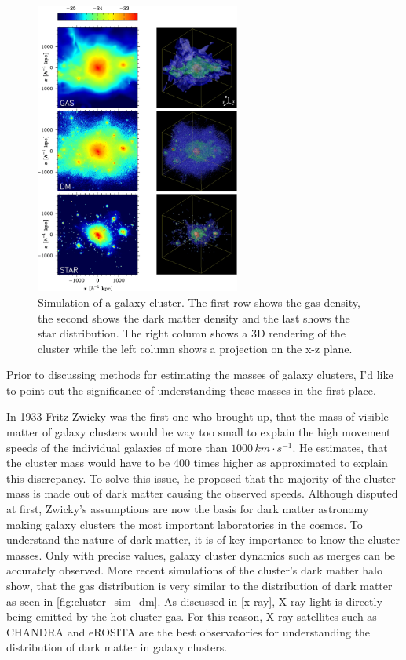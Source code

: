 \begin{figure}[h]
 \centering
 \includegraphics[width=0.6\textwidth]{images/Chapter2/apj464555f1_hr.jpg}
 \caption{Simulation of a galaxy cluster. The first row shows the gas density, the second shows the dark matter density and the last shows the star distribution. The right column shows a 3D rendering of the cluster while the left column shows a projection on the x-z plane.  \citep{Suto_2013}}
 \label{fig:cluster_sim_dm}
\end{figure}

Prior to discussing methods for estimating the masses of galaxy clusters, I'd like to point out the significance of understanding these masses in the first place.

In 1933 Fritz Zwicky was the first one who brought up, that the mass of visible matter of galaxy clusters would be way too small to explain the high movement speeds of the individual galaxies of more than $1000 \, km\cdot s^{-1}$. He estimates, that the cluster mass would have to be 400 times higher as approximated to explain this discrepancy. \citep{Zwicky_1933} To solve this issue, he proposed that the majority of the cluster mass is made out of dark matter causing the observed speeds. Although disputed at first, Zwicky's assumptions are now the basis for dark matter astronomy making galaxy clusters the most important laboratories in the cosmos. To understand the nature of dark matter, it is of key importance to know the cluster masses. Only with precise values, galaxy cluster dynamics such as merges can be accurately observed. More recent simulations of the cluster's dark matter halo show, that the gas distribution is very similar to the distribution of dark matter as seen in \autoref{fig:cluster_sim_dm}. As discussed in \cref{x-ray}, X-ray light is directly being emitted by the hot cluster gas. For this reason, X-ray satellites such as CHANDRA and eROSITA are the best observatories for understanding the distribution of dark matter in galaxy clusters.


